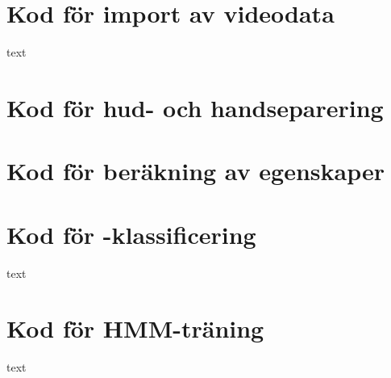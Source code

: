 \documentclass[../rapport_MVEX01-11-05]{subfiles}
\begin{document}
\overfullrule=5mm


\section{Kod för import av videodata}

text

\section{Kod för hud- och handseparering}


\section{Kod för beräkning av egenskaper}\label{sec:matlab:features}


\section{Kod för \knn-klassificering}

text

\section{Kod för HMM-träning}

text

\end{document}
